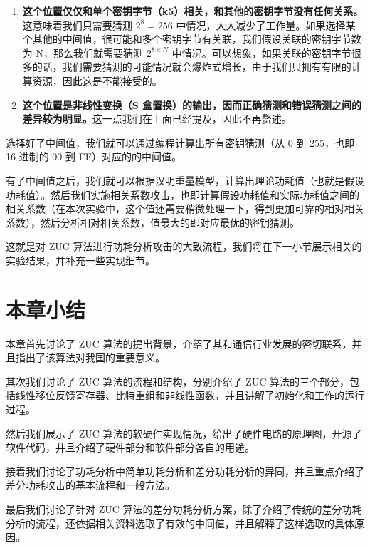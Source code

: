 \begin{enumerate}
    \item \textbf{这个位置仅仅和单个密钥字节（k5）相关，和其他的密钥字节没有任何关系。}这意味着我们只需要猜测 $2^8=256$ 中情况，大大减少了工作量。如果选择某个其他的中间值，很可能和多个密钥字节有关联，我们假设关联的密钥字节数为 N，那么我们就需要猜测 $2^{8 \times N}$ 中情况。可以想象，如果关联的密钥字节很多的话，我们需要猜测的可能情况就会爆炸式增长，由于我们只拥有有限的计算资源，因此这是不能接受的。
    \item \textbf{这个位置是非线性变换（S 盒置换）的输出，因而正确猜测和错误猜测之间的差异较为明显。}这一点我们在上面已经提及，因此不再赘述。
\end{enumerate}

\vspace*{\baselineskip}

选择好了中间值，我们就可以通过编程计算出所有密钥猜测（从 0 到 255，也即 16 进制的 00 到 FF）对应的的中间值。

有了中间值之后，我们就可以根据汉明重量模型，计算出理论功耗值（也就是假设功耗值）。然后我们实施相关系数攻击，也即计算假设功耗值和实际功耗值之间的相关系数（在本次实验中，这个值还需要稍微处理一下，得到更加可靠的相对相关系数），然后分析相对相关系数，值最大的即对应最优的密钥猜测。

这就是对 ZUC 算法进行功耗分析攻击的大致流程，我们将在下一小节展示相关的实验结果，并补充一些实现细节。

\section{本章小结}

本章首先讨论了 ZUC 算法的提出背景，介绍了其和通信行业发展的密切联系，并且指出了该算法对我国的重要意义。

其次我们讨论了 ZUC 算法的流程和结构，分别介绍了 ZUC 算法的三个部分，包括线性移位反馈寄存器、比特重组和非线性函数，并且讲解了初始化和工作的运行过程。

然后我们展示了 ZUC 算法的软硬件实现情况，给出了硬件电路的原理图，开源了软件代码，并且介绍了硬件部分和软件部分各自的用途。

接着我们讨论了功耗分析中简单功耗分析和差分功耗分析的异同，并且重点介绍了差分功耗攻击的基本流程和一般方法。

最后我们讨论了针对 ZUC 算法的差分功耗分析方案，除了介绍了传统的差分功耗分析的流程，还依据相关资料选取了有效的中间值，并且解释了这样选取的具体原因。
